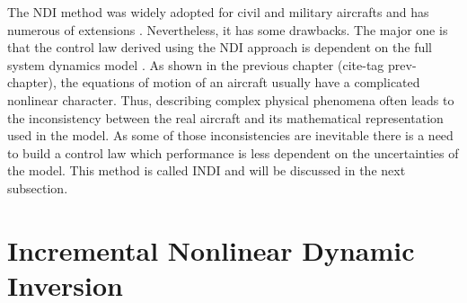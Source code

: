 \documentclass[11pt, a4paper, twoside]{report}
\begin{document}
The \acrshort{NDI} method was widely adopted for civil and military aircrafts and has numerous of extensions \cite{Horn}. Nevertheless, it has some drawbacks. The major one is that the control law derived using the \acrshort{NDI} approach is dependent on the full system dynamics model \cite{Sieberling}. As shown in the previous chapter (cite-tag prev-chapter), the equations of motion of an aircraft usually have a complicated nonlinear character. Thus, describing complex physical phenomena often leads to the inconsistency between the real aircraft and its mathematical representation used in the model. As some of those inconsistencies are inevitable there is a need to build a control law which performance is less dependent on the uncertainties of the model. This method is called \acrfull{INDI} and will be discussed in the next subsection.

\section{Incremental Nonlinear Dynamic Inversion} \label{sec:indi}
\end{document}
